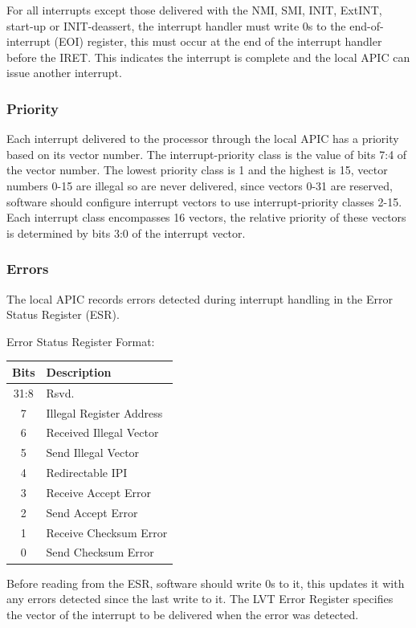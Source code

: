 \documentclass{article}
\newcommand{\layout}[1]{\parbox{\linewidth}{#1}}
\begin{document}
\layout{
  For all interrupts except those delivered with the NMI, SMI, INIT, ExtINT, start-up or INIT-deassert, the interrupt handler must write 0s to the end-of-interrupt (EOI) register, this must occur at the end of the interrupt handler before the IRET. This indicates the interrupt is complete and the local APIC can issue another interrupt.

  \bigskip \cite[Chapter~12.8.5]{sdm3}
}

\layout{
  \subsubsection{Priority}

  Each interrupt delivered to the processor through the local APIC has a priority based on its vector number.
  The interrupt-priority class is the value of bits 7:4 of the vector number.
  The lowest priority class is 1 and the highest is 15, vector numbers 0-15 are illegal so are never delivered, since vectors 0-31 are reserved, software should configure interrupt vectors to use interrupt-priority classes 2-15.
  Each interrupt class encompasses 16 vectors, the relative priority of these vectors is determined by bits 3:0 of the interrupt vector.

  \bigskip \cite[Chapter~12.8.3]{sdm3}
}

\layout{
  \subsubsection{Errors}

  The local APIC records errors detected during interrupt handling in the Error Status Register (ESR).

  \bigskip

  Error Status Register Format:
  \begin{table}[H]
    \centering
    \begin{tabular}{|c|l|}
      \hline \textbf{Bits} & \textbf{Description} \\ \hline
      31:8 & Rsvd. \\
      7 & Illegal Register Address \\
      6 & Received Illegal Vector \\
      5 & Send Illegal Vector \\
      4 & Redirectable IPI \\
      3 & Receive Accept Error \\
      2 & Send Accept Error \\
      1 & Receive Checksum Error \\
      0 & Send Checksum Error \\ \hline
    \end{tabular}
  \end{table}

  Before reading from the ESR, software should write 0s to it, this updates it with any errors detected since the last write to it.
  The LVT Error Register specifies the vector of the interrupt to be delivered when the error was detected.

  \bigskip \cite[Chapter~12.5.3]{sdm3}
}
\end{document}
